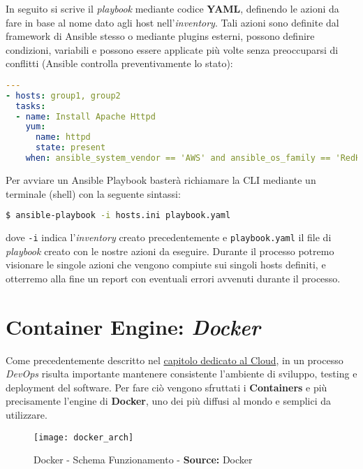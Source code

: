 \documentclass[../main.tex]{subfiles}
\begin{document}
    	        In seguito si scrive il \emph{playbook} mediante codice \textbf{YAML}, definendo le azioni da fare in base al nome dato agli host nell'\emph{inventory}. Tali azioni sono definite dal framework di Ansible stesso o mediante plugins esterni, possono definire condizioni, variabili e possono essere applicate più volte senza preoccuparsi di conflitti (Ansible controlla preventivamente lo stato):
    	        \begin{lstlisting}[language=yaml]
---
- hosts: group1, group2
  tasks:
  - name: Install Apache Httpd
    yum:
      name: httpd
      state: present
    when: ansible_system_vendor == 'AWS' and ansible_os_family == 'RedHat'
    	        \end{lstlisting}
    	
    	        Per avviare un Ansible Playbook basterà richiamare la CLI mediante un terminale (shell) con la seguente sintassi:
    	        \begin{lstlisting}[language=bash]
$ ansible-playbook -i hosts.ini playbook.yaml
    	        \end{lstlisting}
    	        dove \verb|-i| indica l'\emph{inventory} creato precedentemente e \verb|playbook.yaml| il file di \emph{playbook} creato con le nostre azioni da eseguire. Durante il processo potremo visionare le singole azioni che vengono compiute sui singoli hosts definiti, e otterremo alla fine un report con eventuali errori avvenuti durante il processo.
    	
    	\section{Container Engine: \emph{Docker}}
    	    
    	    Come precedentemente descritto nel \hyperref[sec:cloud_containers]{capitolo dedicato al Cloud}, in un processo \emph{DevOps} risulta importante mantenere consistente l'ambiente di sviluppo, testing e deployment del software. Per fare ciò vengono sfruttati i \textbf{Containers} e più precisamente l'engine di \textbf{Docker}\cite{docker}, uno dei più diffusi al mondo e semplici da utilizzare.
    	    
    	    \begin{figure}[H]
    			\centering
    			\texttt{[image: docker\_arch]}
    			\caption{Docker - Schema Funzionamento - \textbf{Source:} Docker}
    			\label{fig:docker_arch}
    	    \end{figure}
    	    
\end{document}
